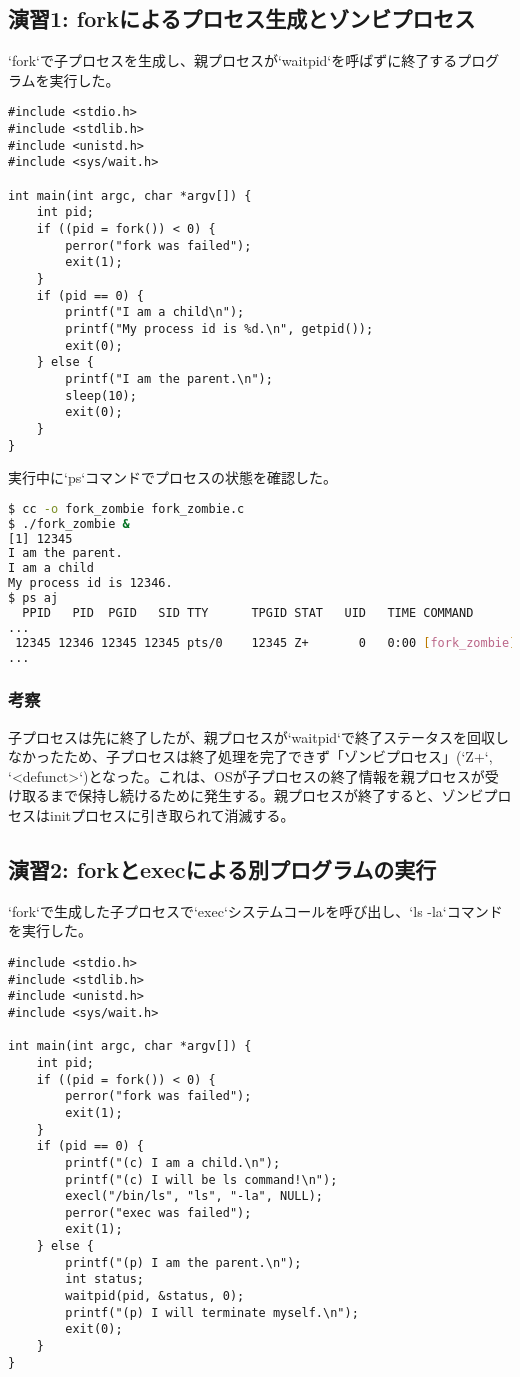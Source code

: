 \documentclass[a4paper,11pt,dvipdfmx]{jsarticle}
\begin{document}
\subsection{演習1: forkによるプロセス生成とゾンビプロセス}
`fork`で子プロセスを生成し、親プロセスが`waitpid`を呼ばずに終了するプログラムを実行した。
\begin{lstlisting}[caption={fork\_zombie.c}, label=lst:fork_zombie]
#include <stdio.h>
#include <stdlib.h>
#include <unistd.h>
#include <sys/wait.h>

int main(int argc, char *argv[]) {
    int pid;
    if ((pid = fork()) < 0) {
        perror("fork was failed");
        exit(1);
    }
    if (pid == 0) { 
        printf("I am a child\n");
        printf("My process id is %d.\n", getpid());
        exit(0);
    } else { 
        printf("I am the parent.\n");
        sleep(10); 
        exit(0);
    }
}
\end{lstlisting}
実行中に`ps`コマンドでプロセスの状態を確認した。
\begin{lstlisting}[language=bash, caption={実行とpsコマンド}]
$ cc -o fork_zombie fork_zombie.c
$ ./fork_zombie &
[1] 12345
I am the parent.
I am a child
My process id is 12346.
$ ps aj
  PPID   PID  PGID   SID TTY      TPGID STAT   UID   TIME COMMAND
...
 12345 12346 12345 12345 pts/0    12345 Z+       0   0:00 [fork_zombie] <defunct>
...
\end{lstlisting}
\subsubsection{考察}
子プロセスは先に終了したが、親プロセスが`waitpid`で終了ステータスを回収しなかったため、子プロセスは終了処理を完了できず「ゾンビプロセス」(`Z+`, `<defunct>`)となった。これは、OSが子プロセスの終了情報を親プロセスが受け取るまで保持し続けるために発生する。親プロセスが終了すると、ゾンビプロセスはinitプロセスに引き取られて消滅する。

\subsection{演習2: forkとexecによる別プログラムの実行}
`fork`で生成した子プロセスで`exec`システムコールを呼び出し、`ls -la`コマンドを実行した。
\begin{lstlisting}[caption={fork\_exec.c}, label=lst:fork_exec]
#include <stdio.h>
#include <stdlib.h>
#include <unistd.h>
#include <sys/wait.h>

int main(int argc, char *argv[]) {
    int pid;
    if ((pid = fork()) < 0) {
        perror("fork was failed");
        exit(1);
    }
    if (pid == 0) { 
        printf("(c) I am a child.\n");
        printf("(c) I will be ls command!\n");
        execl("/bin/ls", "ls", "-la", NULL);
        perror("exec was failed"); 
        exit(1);
    } else { 
        printf("(p) I am the parent.\n");
        int status;
        waitpid(pid, &status, 0);
        printf("(p) I will terminate myself.\n");
        exit(0);
    }
}
\end{lstlisting}
\end{document}
